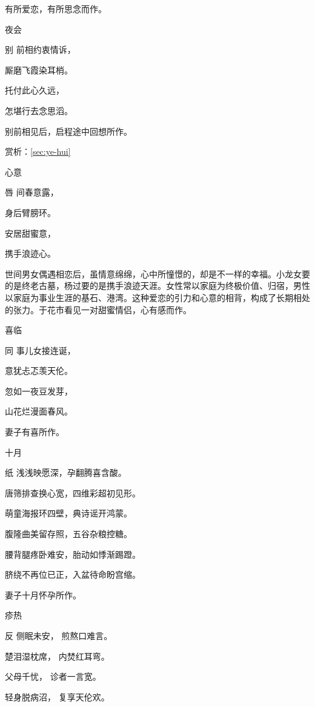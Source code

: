 \documentclass{article}
\newenvironment{poem}[3]{
\begin{minipage}{\textwidth}
\begin{pinyinscope}\begin{center}\Large\linespread{1.4}\selectfont #2\end{center}\end{pinyinscope}
\begin{pinyinscope}
	\begin{center}
	\Large\linespread{1.4}\rmfamily\selectfont #3
}{\end{center}
\end{pinyinscope}
\end{minipage}
}
\begin{document}
有所爱恋，有所思念而作。

\begin{poem}{}{夜会}
别前相约衷情诉，

厮磨飞霞染耳梢。

托付此心{}久远，

怎堪行去念思滔。
\end{poem}

别前相见后，启程途中回想所作。

赏析：\ref{sec:ye-hui}

\begin{poem}{}{心意}
唇间春意露，

身后臂膀环。

安居甜蜜意，

携手浪迹心。
\end{poem}

世间男女偶遇相恋后，虽情意绵绵，心中所憧憬的，却是不一样的幸福。小龙女要的是终老古墓，杨过要的是携手浪迹天涯。女性常以家庭为终极价值、归宿，男性以家庭为事业生涯的基石、港湾。这种爱恋的引力和心意的相背，构成了长期相处的张力。于花市看见一对甜蜜情侣，心有感而作。

\begin{poem}{}{喜临}
同事儿女接连诞，

意犹忐忑羡天伦。

忽如一夜豆发芽，

山花烂漫面春风。
\end{poem}

妻子有喜所作。

\begin{poem}{}{十月}
纸{}浅浅映愿深，孕{}翻腾喜含酸。

唐筛排查换心宽，四维彩超初见形。

萌童海报环四壁，典{}诗谣开鸿蒙。

腹隆曲美留存照，五谷杂粮控{}糖。

腰背腿疼卧难安，胎动如悸渐踢蹬。

脐绕不再位已正，入盆待命盼宫缩。
\end{poem}

妻子十月怀孕所作。

\begin{poem}{}{疹热}
反侧眠未安，
煎熬口难言。

楚泪湿枕席，
内焚红耳弯。

父母千{}忧，
诊者一言宽。

轻身脱病沼，
复享天伦欢。
\end{poem}
\end{document}

